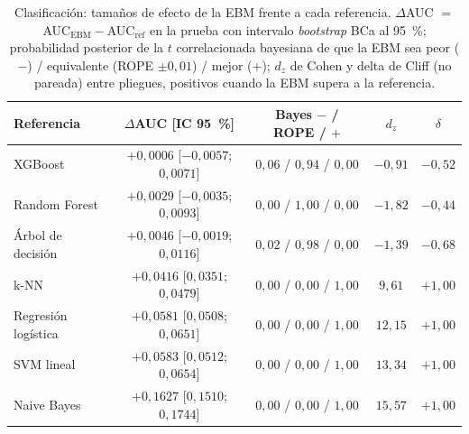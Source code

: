 \begin{table}[tbp]
  \centering\small\setlength{\tabcolsep}{3pt}
  \caption{Clasificación: tamaños de efecto de la EBM frente a cada referencia. $\Delta$AUC $=$ AUC$_{\mathrm{EBM}} - $AUC$_{\mathrm{ref}}$ en la prueba con intervalo \emph{bootstrap} BCa al 95~\%; probabilidad posterior de la $t$ correlacionada bayesiana de que la EBM sea peor ($-$) / equivalente (ROPE $\pm 0{,}01$) / mejor ($+$); $d_z$ de Cohen y delta de Cliff (no pareada) entre pliegues, positivos cuando la EBM supera a la referencia.}
  \label{tab:efectos_clasificacion}
  \begin{tabular}{@{}l c c c c@{}}
    \toprule
    Referencia & $\Delta$AUC [IC 95~\%] & Bayes $-$ / ROPE / $+$ & $d_z$ & $\delta$ \\
    \midrule
    XGBoost & $+0{,}0006$ [$-0{,}0057$; $0{,}0071$] & $0{,}06$ / $0{,}94$ / $0{,}00$ & $-0{,}91$ & $-0{,}52$ \\
    Random Forest & $+0{,}0029$ [$-0{,}0035$; $0{,}0093$] & $0{,}00$ / $1{,}00$ / $0{,}00$ & $-1{,}82$ & $-0{,}44$ \\
    Árbol de decisión & $+0{,}0046$ [$-0{,}0019$; $0{,}0116$] & $0{,}02$ / $0{,}98$ / $0{,}00$ & $-1{,}39$ & $-0{,}68$ \\
    k-NN & $+0{,}0416$ [$0{,}0351$; $0{,}0479$] & $0{,}00$ / $0{,}00$ / $1{,}00$ & $9{,}61$ & $+1{,}00$ \\
    Regresión logística & $+0{,}0581$ [$0{,}0508$; $0{,}0651$] & $0{,}00$ / $0{,}00$ / $1{,}00$ & $12{,}15$ & $+1{,}00$ \\
    SVM lineal & $+0{,}0583$ [$0{,}0512$; $0{,}0654$] & $0{,}00$ / $0{,}00$ / $1{,}00$ & $13{,}34$ & $+1{,}00$ \\
    Naive Bayes & $+0{,}1627$ [$0{,}1510$; $0{,}1744$] & $0{,}00$ / $0{,}00$ / $1{,}00$ & $15{,}57$ & $+1{,}00$ \\
    \bottomrule
  \end{tabular}
\end{table}
